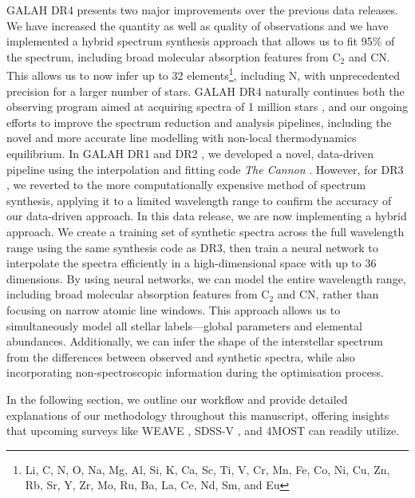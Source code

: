 \documentclass[
  journal=pasa,
  manuscript=research-paper, %
  year=2024,
  volume=37
]{cup-journal}
\begin{document}
GALAH DR4 presents two major improvements over the previous data releases. We have increased the quantity as well as quality of observations and we have implemented a hybrid spectrum synthesis approach that allows us to fit 95\% of the spectrum, including broad molecular absorption features from $\mathrm{C_2}$ and CN. This allows us to now infer up to 32 elements\footnote{
Li, C, N, O, Na, Mg, Al, Si, K, Ca,
Sc, Ti, V, Cr, Mn, Fe, Co, Ni, Cu, Zn,
Rb, Sr, Y, Zr, Mo, Ru, Ba, La, Ce, Nd,
Sm, and Eu}, including N, with unprecedented precision for a larger number of stars. GALAH DR4 naturally continues both the observing program aimed at acquiring spectra of 1 million stars \citep{DeSilva2015}, and our ongoing efforts to improve the spectrum reduction and analysis pipelines, including the novel and more accurate line modelling with non-local thermodynamics equilibrium. In GALAH DR1 and DR2 \citep{Martell2017, Buder2018}, we developed a novel, data-driven pipeline using the interpolation and fitting code \textit{The Cannon} \citep{Ness2015}. However, for DR3 \citep{Buder2021}, we reverted to the more computationally expensive method of spectrum synthesis, applying it to a limited wavelength range to confirm the accuracy of our data-driven approach. In this data release, we are now implementing a hybrid approach. We create a training set of synthetic spectra across the full wavelength range using the same synthesis code as DR3, then train a neural network to interpolate the spectra efficiently in a high-dimensional space with up to 36 dimensions. By using neural networks, we can model the entire wavelength range, including broad molecular absorption features from $\mathrm{C_2}$ and CN, rather than focusing on narrow atomic line windows. This approach allows us to simultaneously model all stellar labels—global parameters and elemental abundances. Additionally, we can infer the shape of the interstellar spectrum from the differences between observed and synthetic spectra, while also incorporating non-spectroscopic information during the optimisation process.

In the following section, we outline our workflow and provide detailed explanations of our methodology throughout this manuscript, offering insights that upcoming surveys like WEAVE \citep{Dalton2014}, SDSS-V \citep{Kollmeier2017}, and 4MOST \citep{4MOST2019} can readily utilize.
\end{document}
